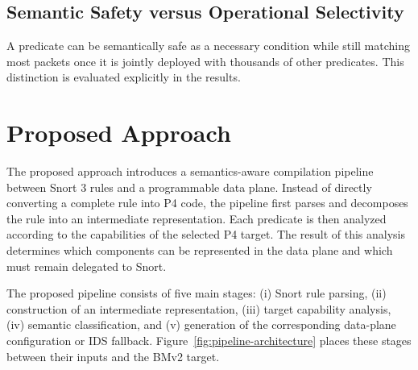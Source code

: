 \documentclass{article}
\begin{document}
\subsection{Semantic Safety versus Operational Selectivity}
A predicate can be semantically safe as a necessary condition while still
matching most packets once it is jointly deployed with thousands of other
predicates. This distinction is evaluated explicitly in the results.
\section{Proposed Approach}
\label{sec:approach}
The proposed approach introduces a semantics-aware compilation pipeline
between Snort 3 rules and a programmable data plane. Instead of directly
converting a complete rule into P4 code, the pipeline first parses and
decomposes the rule into an intermediate representation. Each predicate
is then analyzed according to the capabilities of the selected P4 target.
The result of this analysis determines which components can be represented
in the data plane and which must remain delegated to Snort.

The proposed pipeline consists of five main stages: (i) Snort rule
parsing, (ii) construction of an intermediate representation,
(iii) target capability analysis, (iv) semantic classification, and
(v) generation of the corresponding data-plane configuration or IDS
fallback. Figure~\ref{fig:pipeline-architecture} places these stages
between their inputs and the BMv2 target.
\end{document}
